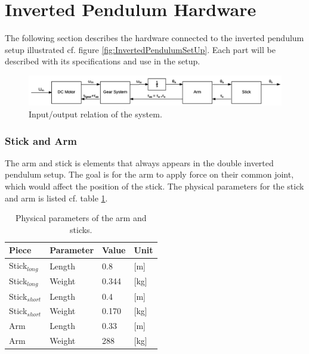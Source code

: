 \section{Inverted Pendulum Hardware}
The following section describes the hardware connected to the inverted pendulum setup illustrated cf. figure \ref{fig:InvertedPendulumSetUp}.
Each part will be described with its specifications and use in the setup.

\begin{figure} [htbp]
\hspace*{-3.5cm}  
	\centering
	\includegraphics[width=0.95\paperwidth]{figures/modeling/InputOutputSystem.png}
	\caption{Input/output relation of the system.} \label{fig:DCMotorRelation}
\end{figure}

\startexplain
\stopexplain


\subsubsection{Stick and Arm}
The arm and stick is elements that always appears in the double inverted pendulum setup. The goal is for the arm to apply force on their common joint, which would affect the position of the stick. The physical parameters for the stick and arm is listed cf. table \ref{DimensionsStick}.

\begin{table}[htbp]
\centering
\begin{tabular}{llll}
\hline
Piece           & Parameter & Value & Unit \\ \hline
Stick$_{long}$  & Length    & 0.8   & [m]    \\
Stick$_{long}$  & Weight    & 0.344 & [kg]    \\ 
Stick$_{short}$ & Length    & 0.4   & [m]    \\
Stick$_{short}$ & Weight    & 0.170 & [kg]    \\ 
Arm             & Length    & 0.33  & [m]    \\
Arm             & Weight    & 288   & [kg]   \\ 
\end{tabular}
\caption{Physical parameters of the arm and sticks.}
\label{DimensionsStick}
\end{table}

